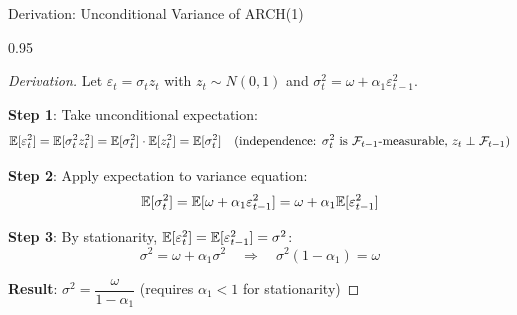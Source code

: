 \documentclass[9pt, aspectratio=169, t]{beamer}
\begin{document}
\begin{frame}{Derivation: Unconditional Variance of ARCH(1)}
    \begin{cminipage}{0.95\textwidth}
    \begin{proof}[Derivation]
        Let $\varepsilon_t = \sigma_t z_t$ with $z_t \sim N(0,1)$ and $\sigma_t^2 = \omega + \alpha_1 \varepsilon_{t-1}^2$.

        \vspace{0.2cm}
        \textbf{Step 1}: Take unconditional expectation:
        \[
            \mathbb{E}[\varepsilon_t^2] = \mathbb{E}[\sigma_t^2 z_t^2] = \mathbb{E}[\sigma_t^2] \cdot \mathbb{E}[z_t^2] = \mathbb{E}[\sigma_t^2] \quad \text{(independence: $\sigma_t^2$ is $\mathcal{F}_{t-1}$-measurable, $z_t \perp \mathcal{F}_{t-1}$)}
        \]

        \textbf{Step 2}: Apply expectation to variance equation:
        \[
            \mathbb{E}[\sigma_t^2] = \mathbb{E}[\omega + \alpha_1 \varepsilon_{t-1}^2] = \omega + \alpha_1 \mathbb{E}[\varepsilon_{t-1}^2]
        \]

        \textbf{Step 3}: By stationarity, $\mathbb{E}[\varepsilon_t^2] = \mathbb{E}[\varepsilon_{t-1}^2] = \sigma^2$:
        \[
            \sigma^2 = \omega + \alpha_1 \sigma^2 \quad \Rightarrow \quad \sigma^2 (1 - \alpha_1) = \omega
        \]

        \textbf{Result}: $\boxed{\sigma^2 = \dfrac{\omega}{1 - \alpha_1}}$ \quad (requires $\alpha_1 < 1$ for stationarity)
    \end{proof}
    \end{cminipage}
\end{frame}
\end{document}
